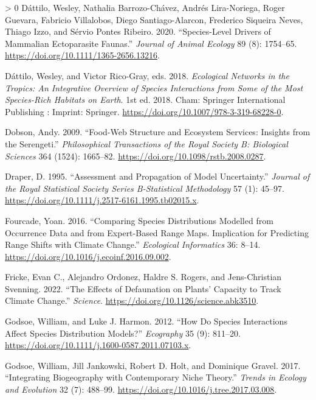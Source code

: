 \documentclass[11pt]{article}
\newlength{\cslhangindent}
\newenvironment{CSLReferences}[3] %
 {%
  \setlength{\parindent}{0pt}
  \ifodd #1 \everypar{\setlength{\hangindent}{\cslhangindent}}\ignorespaces\fi
  \ifnum #2 > 0
  \setlength{\parskip}{#2\baselineskip}
  \fi
 }%
 {}
\begin{document}
\begin{CSLReferences}{1}{0}
\leavevmode\hypertarget{ref-Dattilo2020SpeDri}{}%
Dáttilo, Wesley, Nathalia Barrozo-Chávez, Andrés Lira-Noriega, Roger
Guevara, Fabricio Villalobos, Diego Santiago-Alarcon, Frederico Siqueira
Neves, Thiago Izzo, and Sérvio Pontes Ribeiro. 2020. {``Species-Level
Drivers of Mammalian Ectoparasite Faunas.''} \emph{Journal of Animal
Ecology} 89 (8): 1754--65.
\url{https://doi.org/10.1111/1365-2656.13216}.

\leavevmode\hypertarget{ref-Dattilo2018EcoNet}{}%
Dáttilo, Wesley, and Victor Rico-Gray, eds. 2018. \emph{Ecological
Networks in the Tropics: An Integrative Overview of Species Interactions
from Some of the Most Species-Rich Habitats on Earth}. 1st ed. 2018.
Cham: Springer International Publishing : Imprint: Springer.
\url{https://doi.org/10.1007/978-3-319-68228-0}.

\leavevmode\hypertarget{ref-Dobson2009FooStr}{}%
Dobson, Andy. 2009. {``Food-Web Structure and Ecosystem Services:
Insights from the Serengeti.''} \emph{Philosophical Transactions of the
Royal Society B: Biological Sciences} 364 (1524): 1665--82.
\url{https://doi.org/10.1098/rstb.2008.0287}.

\leavevmode\hypertarget{ref-Draper1995AssPro}{}%
Draper, D. 1995. {``Assessment and Propagation of Model Uncertainty.''}
\emph{Journal of the Royal Statistical Society Series B-Statistical
Methodology} 57 (1): 45--97.
\url{https://doi.org/10.1111/j.2517-6161.1995.tb02015.x}.

\leavevmode\hypertarget{ref-Fourcade2016ComSpe}{}%
Fourcade, Yoan. 2016. {``Comparing Species Distributions Modelled from
Occurrence Data and from Expert-Based Range Maps. Implication for
Predicting Range Shifts with Climate Change.''} \emph{Ecological
Informatics} 36: 8--14.
\url{https://doi.org/10.1016/j.ecoinf.2016.09.002}.

\leavevmode\hypertarget{ref-Fricke2022EffDef}{}%
Fricke, Evan C., Alejandro Ordonez, Haldre S. Rogers, and Jens-Christian
Svenning. 2022. {``The Effects of Defaunation on Plants' Capacity to
Track Climate Change.''} \emph{Science}.
\url{https://doi.org/10.1126/science.abk3510}.

\leavevmode\hypertarget{ref-Godsoe2012HowSpe}{}%
Godsoe, William, and Luke J. Harmon. 2012. {``How Do Species
Interactions Affect Species Distribution Models?''} \emph{Ecography} 35
(9): 811--20. \url{https://doi.org/10.1111/j.1600-0587.2011.07103.x}.

\leavevmode\hypertarget{ref-Godsoe2017IntBio}{}%
Godsoe, William, Jill Jankowski, Robert D. Holt, and Dominique Gravel.
2017. {``Integrating Biogeography with Contemporary Niche Theory.''}
\emph{Trends in Ecology and Evolution} 32 (7): 488--99.
\url{https://doi.org/10.1016/j.tree.2017.03.008}.


\end{CSLReferences}
\end{document}
